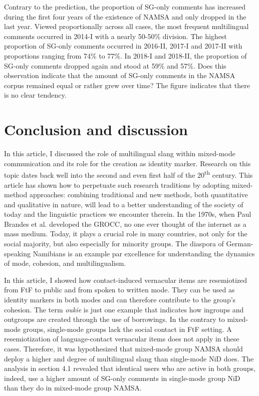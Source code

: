 \documentclass[output=paper]{langsci/langscibook}
\begin{document}
Contrary to the prediction, the proportion of SG-only comments has increased during the first four years of the existence of NAMSA and only dropped in the last year. Viewed proportionally across all cases, the most frequent multilingual comments occurred in 2014-I with a nearly 50-50\% division. The highest proportion of SG-only comments occurred in 2016-II, 2017-I and 2017-II with proportions ranging from 74\% to 77\%. In 2018-I and 2018-II, the proportion of SG-only comments dropped again and stood at 59\% and 57\%. Does this observation indicate that the amount of SG-only comments in the NAMSA corpus remained equal or rather grew over time? The figure indicates that there is no clear tendency.

 
\section{Conclusion and discussion}
 \label{sec:radke:5}

In this article, I discussed the role of multilingual slang within mixed-mode communication and its role for the creation as identity marker.  Research on this topic dates back well into the second and even first half of the 20\textsuperscript{th} century. This article has shown how to perpetuate such research traditions by adopting mixed-method approaches: combining traditional and new methods, both quantitative and qualitative in nature, will lead to a better understanding of the society of today and the linguistic practices we encounter therein. In the 1970s, when Paul Brandes et al. developed the GROCC, no one ever thought of the internet as a mass medium. Today, it plays a crucial role in many countries, not only for the social majority, but also especially for minority groups. The diaspora of German-speaking Namibians is an example par excellence for understanding the dynamics of mode, cohesion, and multilingualism. 

In this article, I showed how contact-induced vernacular items are resemiotized from FtF to public and from spoken to written mode. They can be used as identity markers in both modes and can therefore contribute to the group’s cohesion. The term \textit{oukie} is just one example that indicates how ingroups and outgroups are created through the use of borrowings. In the contrary to mixed-mode groups, single-mode groups lack the social contact in FtF setting. A resemiotization of language-contact vernacular items does not apply in these cases. Therefore, it was hypothesized that mixed-mode group NAMSA should deploy a higher and degree of multilingual slang than single-mode NiD does. The analysis in section 4.1 revealed that identical users who are active in both groups, indeed, use a higher amount of SG-only comments in single-mode group NiD than they do in mixed-mode group NAMSA.
\end{document}
